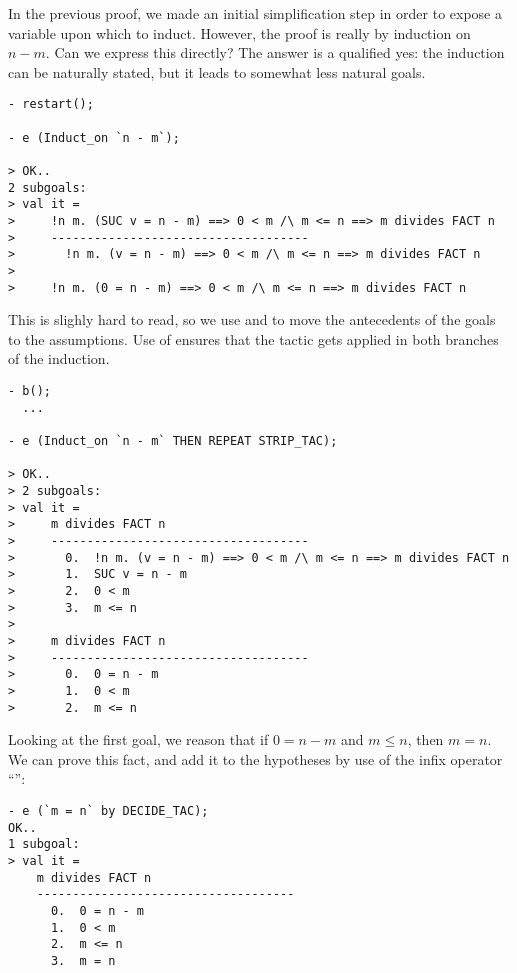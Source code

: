 In the previous proof, we made an initial simplification step in order
to expose a variable upon which to induct. However, the proof is
really by induction on $n - m$. Can we express this directly? The
answer is a qualified yes: the induction can be naturally stated, but
it leads to somewhat less natural goals.
\begin{session}\begin{verbatim}
- restart();

- e (Induct_on `n - m`);

> OK..
2 subgoals:
> val it =
>     !n m. (SUC v = n - m) ==> 0 < m /\ m <= n ==> m divides FACT n
>     ------------------------------------
>       !n m. (v = n - m) ==> 0 < m /\ m <= n ==> m divides FACT n
>
>     !n m. (0 = n - m) ==> 0 < m /\ m <= n ==> m divides FACT n
\end{verbatim}\end{session}
    This is slighly hard to read, so we use  and
     to move the antecedents of the goals to the
    assumptions. Use of  ensures that the tactic gets applied
    in both branches of the induction.
\begin{session}\begin{verbatim}
- b();
  ...

- e (Induct_on `n - m` THEN REPEAT STRIP_TAC);

> OK..
> 2 subgoals:
> val it =
>     m divides FACT n
>     ------------------------------------
>       0.  !n m. (v = n - m) ==> 0 < m /\ m <= n ==> m divides FACT n
>       1.  SUC v = n - m
>       2.  0 < m
>       3.  m <= n
>
>     m divides FACT n
>     ------------------------------------
>       0.  0 = n - m
>       1.  0 < m
>       2.  m <= n
\end{verbatim}\end{session}
Looking at the first goal, we reason that if $0 = n - m$ and $m
\leq n$, then $m = n$. We can prove this fact, and add it to the
hypotheses by use of the infix operator ``'':
\begin{session}\begin{verbatim}
- e (`m = n` by DECIDE_TAC);
OK..
1 subgoal:
> val it =
    m divides FACT n
    ------------------------------------
      0.  0 = n - m
      1.  0 < m
      2.  m <= n
      3.  m = n
\end{verbatim}\end{session}

